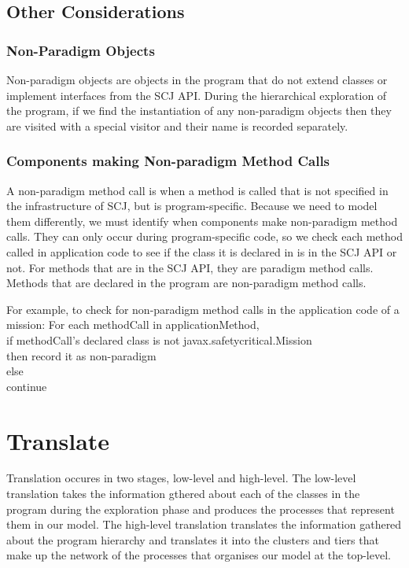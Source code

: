 \documentclass[10pt,a4paper]{article}
\newenvironment{ttSection}{\ttfamily}{\par}
\begin{document}
\subsection{Other Considerations}

\subsubsection{Non-Paradigm Objects}

Non-paradigm objects are objects in the program that do not extend classes or implement interfaces from the SCJ API. During the hierarchical exploration of the program, if we find the instantiation of any non-paradigm objects then they are visited with a special visitor and their name is recorded separately.

\subsubsection{Components making Non-paradigm Method Calls}

A non-paradigm method call is when a method is called that is not specified in the infrastructure of SCJ, but is program-specific. Because we need to model them differently, we must identify when components make non-paradigm method calls. They can only occur during program-specific code, so we check each method called in application code to see if the class it is declared in is in the SCJ API or not. For methods that are in the SCJ API, they are paradigm method calls. Methods that are declared in the program are non-paradigm method calls. 

For example, to check for non-paradigm method calls in the application code of a mission:
\begin{ttSection}
For each methodCall in applicationMethod, \\
if methodCall's declared class is not javax.safetycritical.Mission \\
then record it as non-paradigm\\
else\\
continue
\end{ttSection}


\section{Translate}
\label{sec:translation}

Translation occures in two stages, low-level and high-level. The low-level translation takes the information gthered about each of the classes in the program during the exploration phase and produces the processes that represent them in our model. The high-level translation translates the information gathered about the program hierarchy and translates it into the clusters and tiers that make up the network of the processes that organises our model at the top-level.
\end{document}
